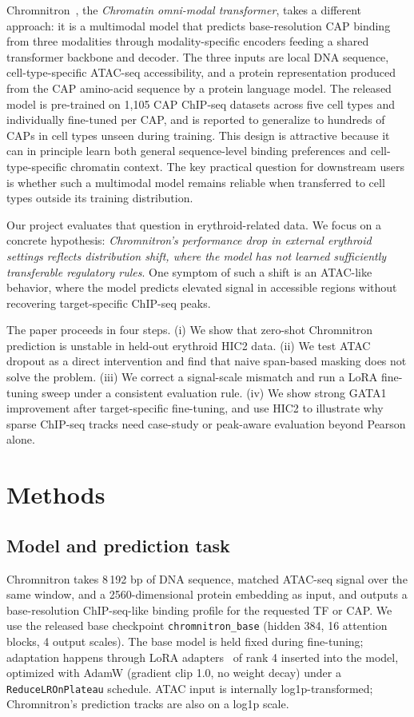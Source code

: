 \documentclass[nohyperref]{article}
\begin{document}
Chromnitron~\citep{tan2025chromnitron}, the \emph{Chromatin omni-modal transformer}, takes a different approach: it is a multimodal model that predicts base-resolution CAP binding from three modalities through modality-specific encoders feeding a shared transformer backbone and decoder. The three inputs are local DNA sequence, cell-type-specific ATAC-seq accessibility, and a protein representation produced from the CAP amino-acid sequence by a protein language model. The released model is pre-trained on 1{,}105 CAP ChIP-seq datasets across five cell types and individually fine-tuned per CAP, and is reported to generalize to hundreds of CAPs in cell types unseen during training. This design is attractive because it can in principle learn both general sequence-level binding preferences and cell-type-specific chromatin context. The key practical question for downstream users is whether such a multimodal model remains reliable when transferred to cell types outside its training distribution.

Our project evaluates that question in erythroid-related data. We focus on a concrete hypothesis: \emph{Chromnitron's performance drop in external erythroid settings reflects distribution shift, where the model has not learned sufficiently transferable regulatory rules}. One symptom of such a shift is an ATAC-like behavior, where the model predicts elevated signal in accessible regions without recovering target-specific ChIP-seq peaks.

The paper proceeds in four steps. (i) We show that zero-shot Chromnitron prediction is unstable in held-out erythroid HIC2 data. (ii) We test ATAC dropout as a direct intervention and find that naive span-based masking does not solve the problem. (iii) We correct a signal-scale mismatch and run a LoRA fine-tuning sweep under a consistent evaluation rule. (iv) We show strong GATA1 improvement after target-specific fine-tuning, and use HIC2 to illustrate why sparse ChIP-seq tracks need case-study or peak-aware evaluation beyond Pearson alone.

\section{Methods}

\subsection{Model and prediction task}

Chromnitron takes 8\,192 bp of DNA sequence, matched ATAC-seq signal over the same window, and a 2560-dimensional protein embedding as input, and outputs a base-resolution ChIP-seq-like binding profile for the requested TF or CAP. We use the released base checkpoint \texttt{chromnitron\_base} (hidden 384, 16 attention blocks, 4 output scales). The base model is held fixed during fine-tuning; adaptation happens through LoRA adapters~\citep{hu2022lora} of rank 4 inserted into the model, optimized with AdamW (gradient clip 1.0, no weight decay) under a \texttt{ReduceLROnPlateau} schedule. ATAC input is internally log1p-transformed; Chromnitron's prediction tracks are also on a log1p scale.
\end{document}
